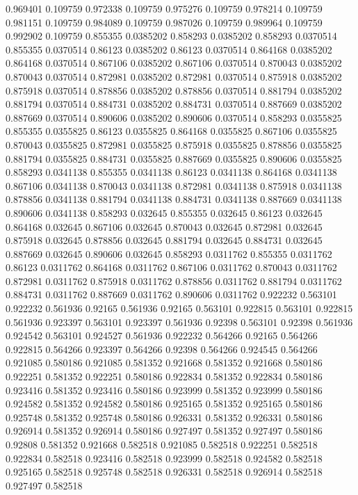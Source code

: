0.969401 0.109759
0.972338 0.109759
0.975276 0.109759
0.978214 0.109759
0.981151 0.109759
0.984089 0.109759
0.987026 0.109759
0.989964 0.109759
0.992902 0.109759
0.855355 0.0385202
0.858293 0.0385202
0.858293 0.0370514
0.855355 0.0370514
0.86123 0.0385202
0.86123 0.0370514
0.864168 0.0385202
0.864168 0.0370514
0.867106 0.0385202
0.867106 0.0370514
0.870043 0.0385202
0.870043 0.0370514
0.872981 0.0385202
0.872981 0.0370514
0.875918 0.0385202
0.875918 0.0370514
0.878856 0.0385202
0.878856 0.0370514
0.881794 0.0385202
0.881794 0.0370514
0.884731 0.0385202
0.884731 0.0370514
0.887669 0.0385202
0.887669 0.0370514
0.890606 0.0385202
0.890606 0.0370514
0.858293 0.0355825
0.855355 0.0355825
0.86123 0.0355825
0.864168 0.0355825
0.867106 0.0355825
0.870043 0.0355825
0.872981 0.0355825
0.875918 0.0355825
0.878856 0.0355825
0.881794 0.0355825
0.884731 0.0355825
0.887669 0.0355825
0.890606 0.0355825
0.858293 0.0341138
0.855355 0.0341138
0.86123 0.0341138
0.864168 0.0341138
0.867106 0.0341138
0.870043 0.0341138
0.872981 0.0341138
0.875918 0.0341138
0.878856 0.0341138
0.881794 0.0341138
0.884731 0.0341138
0.887669 0.0341138
0.890606 0.0341138
0.858293 0.032645
0.855355 0.032645
0.86123 0.032645
0.864168 0.032645
0.867106 0.032645
0.870043 0.032645
0.872981 0.032645
0.875918 0.032645
0.878856 0.032645
0.881794 0.032645
0.884731 0.032645
0.887669 0.032645
0.890606 0.032645
0.858293 0.0311762
0.855355 0.0311762
0.86123 0.0311762
0.864168 0.0311762
0.867106 0.0311762
0.870043 0.0311762
0.872981 0.0311762
0.875918 0.0311762
0.878856 0.0311762
0.881794 0.0311762
0.884731 0.0311762
0.887669 0.0311762
0.890606 0.0311762
0.922232 0.563101
0.922232 0.561936
0.92165 0.561936
0.92165 0.563101
0.922815 0.563101
0.922815 0.561936
0.923397 0.563101
0.923397 0.561936
0.92398 0.563101
0.92398 0.561936
0.924542 0.563101
0.924527 0.561936
0.922232 0.564266
0.92165 0.564266
0.922815 0.564266
0.923397 0.564266
0.92398 0.564266
0.924545 0.564266
0.921085 0.580186
0.921085 0.581352
0.921668 0.581352
0.921668 0.580186
0.922251 0.581352
0.922251 0.580186
0.922834 0.581352
0.922834 0.580186
0.923416 0.581352
0.923416 0.580186
0.923999 0.581352
0.923999 0.580186
0.924582 0.581352
0.924582 0.580186
0.925165 0.581352
0.925165 0.580186
0.925748 0.581352
0.925748 0.580186
0.926331 0.581352
0.926331 0.580186
0.926914 0.581352
0.926914 0.580186
0.927497 0.581352
0.927497 0.580186
0.92808 0.581352
0.921668 0.582518
0.921085 0.582518
0.922251 0.582518
0.922834 0.582518
0.923416 0.582518
0.923999 0.582518
0.924582 0.582518
0.925165 0.582518
0.925748 0.582518
0.926331 0.582518
0.926914 0.582518
0.927497 0.582518
